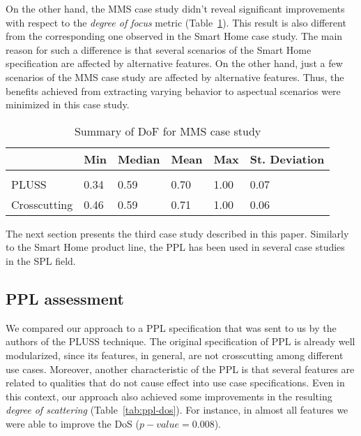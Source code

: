 On the other hand, the MMS case study didn't reveal significant improvements with
respect to the \emph{degree of focus} metric (Table~\ref{tab:mms-dof}). This
result is also different from the corresponding one observed in the Smart Home
case study. The main reason for such a difference is that several scenarios of
the Smart Home specification are affected by alternative features. On the other
hand, just a few scenarios of the MMS case study are affected by alternative
features. Thus, the benefits achieved from extracting varying behavior to
aspectual scenarios were minimized in this case study.

\begin{table}[htb] \centering
\caption{Summary of DoF for MMS case study}
\label{tab:mms-dof}
\begin{small}
\begin{tabular}{llllll} \hline
					& Min 	& Median 	& Mean 	& Max 	& St. Deviation \\ \hline \\
	PLUSS			& 0.34	& 0.59		& 0.70	& 1.00	& 0.07			\\
	Crosscutting	& 0.46  & 0.59   	& 0.71 	& 1.00 	& 0.06			\\ \hline	
\end{tabular}
\end{small}
\end{table}

The next section presents the third case study described in this paper.
Similarly to the Smart Home product line, the PPL has been used in several case
studies~\cite{Conejero:2008aa,Morin:2008aa} in the SPL field.

\subsection{PPL assessment}

We compared our approach to a PPL specification that was sent to us by the
authors of the PLUSS technique. The original specification of PPL is already well
modularized, since its features, in general, are not crosscutting among different
use cases. Moreover, another characteristic of the PPL is that several features
are related to qualities that do not cause effect into use case specifications.
Even in this context, our approach also achieved some improvements in the
resulting \emph{degree of scattering} (Table~\ref{tab:ppl-dos}). For instance, 
in almost all features we were able to improve the DoS ($p-value=0.008$). 


